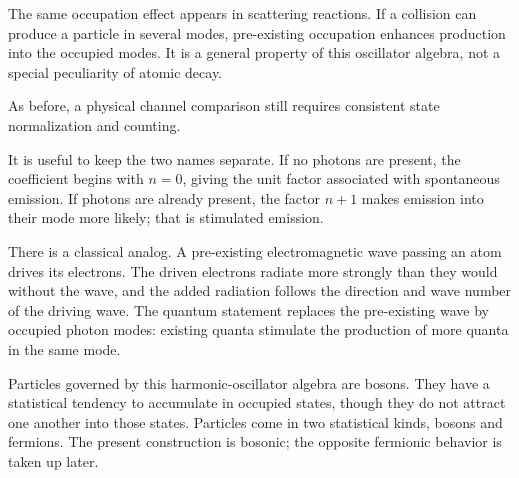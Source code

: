 The same occupation effect appears in scattering reactions. If a collision can produce a particle in several modes, pre-existing occupation enhances production into the occupied modes. It is a general property of this oscillator algebra, not a special peculiarity of atomic decay.

\begin{classroomqa}
\end{classroomqa}

As before, a physical channel comparison still requires consistent state normalization and counting.

\begin{classroomqa}
\end{classroomqa}

It is useful to keep the two names separate. If no photons are present, the coefficient begins with \(n=0\), giving the unit factor associated with spontaneous emission. If photons are already present, the factor \(n+1\) makes emission into their mode more likely; that is stimulated emission.

There is a classical analog. A pre-existing electromagnetic wave passing an atom drives its electrons. The driven electrons radiate more strongly than they would without the wave, and the added radiation follows the direction and wave number of the driving wave. The quantum statement replaces the pre-existing wave by occupied photon modes: existing quanta stimulate the production of more quanta in the same mode.

Particles governed by this harmonic-oscillator algebra are bosons. They have a statistical tendency to accumulate in occupied states, though they do not attract one another into those states. Particles come in two statistical kinds, bosons and fermions. The present construction is bosonic; the opposite fermionic behavior is taken up later.

